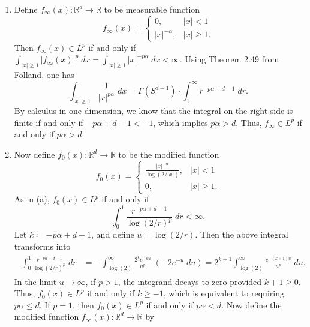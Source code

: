 \documentclass{article}
\begin{document}
\begin{enumerate}[itemsep =-2pt,label = (\alph{*})]
	\item Define $f_{\infty}(x): \mathbb{R}^{d} \to \mathbb{R}$ to be measurable function
	\begin{equation*}
		f_{\infty}(x) = 
		\begin{cases}
			0, & |x| < 1 \\
			|x|^{-\alpha}, & |x|\geq 1.
		\end{cases}
	\end{equation*}
	Then $f_{\infty}(x) \in L^{p}$ if and only if $\int_{|x|\geq 1}|f_{\infty}(x)|^{p}\;dx = \int_{|x|\geq 1}|x|^{-p\alpha}\;dx < \infty$. Using Theorem 2.49 from Folland, one has 
	\begin{equation*}
		\int_{|x|\geq 1}\frac{1}{|x|^{p\alpha}}\;dx = \Gamma(S^{d-1}) \cdot \int_{1}^{\infty}r^{-p\alpha + d - 1}\;dr. 
	\end{equation*}
	By calculus in one dimension, we know that the integral on the right side is finite if and only if $-p\alpha + d - 1 < -1$, which implies $p\alpha > d$. Thus, $f_{\infty}\in L^{p}$ if and only if $p\alpha > d$. 
	\item Now define $f_{0}(x): \mathbb{R}^{d} \to \mathbb{R}$ to be the modified function 
	\begin{equation*}
		f_{0}(x) = 
		\begin{cases}
			\displaystyle \frac{|x|^{-\alpha}}{\log(2/|x|)}, & |x| < 1 \\
			0, & |x| \geq 1. 
		\end{cases}
	\end{equation*}
	As in (a), $f_{0}(x) \in L^{p}$ if and only if 
	\begin{equation*}
		\int_{0}^{1}\frac{r^{-p\alpha + d - 1}}{\log(2/r)^{p}}\;dr < \infty. 
	\end{equation*}
	Let $k \coloneqq -p\alpha + d - 1$, and define $u = \log(2/r)$. Then the above integral transforms into 
	\begin{align*}
		\begin{split}
			\int_{0}^{1}\frac{r^{-p\alpha + d - 1}}{\log(2/r)^{p}}\;dr &= -\int_{\log(2)}^{\infty}\frac{2^{k}e^{-ku}}{u^{p}}\;(-2e^{-u}\;du) = 2^{k + 1}\int_{\log(2)}^{\infty}\frac{e^{-(k + 1)u}}{u^{p}}\;du. 
		\end{split}
	\end{align*}
	In the limit $u \to \infty$, if $p > 1$, the integrand decays to zero provided $k + 1 \geq 0$. Thus, $f_{0}(x) \in L^{p}$ if and only if $k \geq -1$, which is equivalent to requiring $p\alpha \leq d$. If $p = 1$, then $f_{0}(x) \in L^{p}$ if and only if $p\alpha < d$. Now define the modified function $f_{\infty}(x): \mathbb{R}^{d} \to \mathbb{R}$ by 

\end{enumerate}
\end{document}
